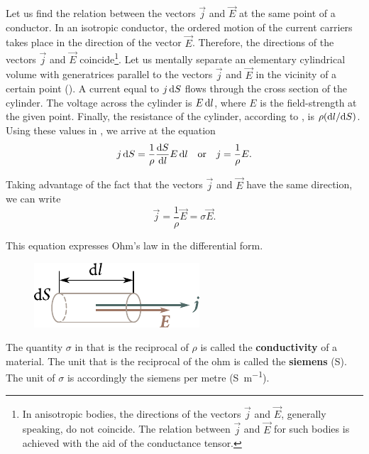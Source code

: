 Let us find the relation between the vectors $\vec{j}$ and $\vec{E}$ at the same point of a conductor. In an isotropic conductor, the ordered motion of the current carriers takes place in the direction of the vector $\vec{E}$. Therefore, the directions of the vectors $\vec{j}$ and $\vec{E}$ coincide\footnote{In anisotropic bodies, the directions of the vectors $\vec{j}$ and $\vec{E}$, generally speaking, do not coincide. The relation between $\vec{j}$ and $\vec{E}$ for such bodies is achieved with the aid of the conductance tensor.}. Let us mentally separate an elementary cylindrical volume with generatrices parallel to the vectors $\vec{j}$ and $\vec{E}$ in the vicinity of a certain point ().
A current equal to $j\,\mathrm{d} S$ flows through the cross section of the cylinder. The voltage across the cylinder is $E\,\mathrm{d} l$, where $E$ is the field-strength at the given point. Finally, the resistance of the cylinder, according to , is $\rho(\mathrm{d} l/\mathrm{d} S)$. Using these values in , we arrive at the equation
\begin{equation*}
    j\, \mathrm{d} S = \frac{1}{\rho} \dfrac{\mathrm{d} S}{\mathrm{d} l} E\, \mathrm{d} l\quad \text{or}\quad j = \frac{1}{\rho} E.
\end{equation*}

\noindent
Taking advantage of the fact that the vectors $\vec{j}$ and $\vec{E}$ have the same direction, we can write
\begin{equation}\label{eq:5_22}
    \vec{j} = \frac{1}{\rho} \vec{E} = \sigma \vec{E}.
\end{equation}

\noindent
This equation expresses Ohm's law in the differential form.

\begin{figure}[t]
	\begin{center}
		\includegraphics[scale=1]{figures/ch_05/fig_5_4.pdf}
		\caption[]{}
		\label{fig:5_4}
	\end{center}
	\vspace{-0.8cm}
\end{figure}

The quantity $\sigma$ in  that is the reciprocal of $\rho$ is called the \textbf{conductivity} of a material. The unit that is the reciprocal of the ohm is called the \textbf{siemens} (\si{\siemens}). The unit of $\sigma$ is accordingly the siemens per metre (\si{\siemens\per\metre}).


